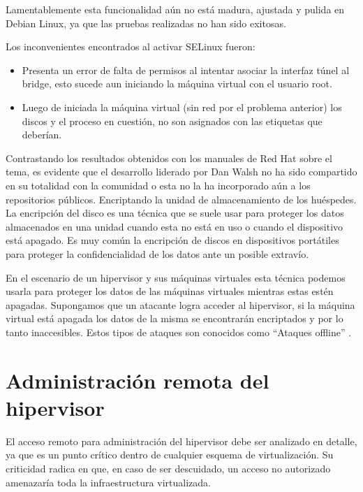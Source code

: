 	Lamentablemente esta funcionalidad aún no está madura, ajustada y
pulida en Debian Linux, ya que las pruebas realizadas no han sido exitosas.
\newline
	
	Los inconvenientes encontrados al activar SELinux fueron:
	\begin{itemize}
		\item Presenta un error de falta de permisos al intentar asociar la interfaz túnel al bridge, esto sucede aun iniciando la máquina virtual con el
		usuario root.
 
		\item Luego de iniciada la máquina virtual (sin red por el problema anterior)
los discos y el proceso en cuestión, no son asignados con las
		etiquetas que deberían.
	\end{itemize}
	
	Contrastando los resultados obtenidos con los manuales de Red Hat
sobre el tema, es evidente que el desarrollo liderado por Dan Walsh no ha	sido compartido en su totalidad con la comunidad o esta no la ha
incorporado aún a los repositorios públicos.
Encriptando la unidad de almacenamiento de los huéspedes.
	La encripción del disco es una técnica que se suele usar para
proteger los datos almacenados en una unidad cuando esta no está en uso o
cuando el dispositivo está apagado. Es muy común la encripción de discos
en dispositivos portátiles para proteger la confidencialidad de los datos ante
un posible extravío.
\newline
	
	En el escenario de un hipervisor y sus máquinas virtuales esta técnica
podemos usarla para proteger los datos de las máquinas virtuales mientras
estas estén apagadas. Supongamos que un atacante logra acceder al
hipervisor, si la máquina virtual está apagada los datos de la misma se
encontrarán encriptados y por lo tanto inaccesibles. Estos tipos de ataques
son conocidos como “Ataques offline” \cite{4}.
	
	\section{Administración remota del hipervisor}
	El acceso remoto para administración del hipervisor debe ser
analizado en detalle, ya que es un punto crítico dentro de cualquier esquema
	de virtualización. Su criticidad radica en que, en caso de ser descuidado, un
acceso no autorizado amenazaría toda la infraestructura virtualizada.
\newline
	
